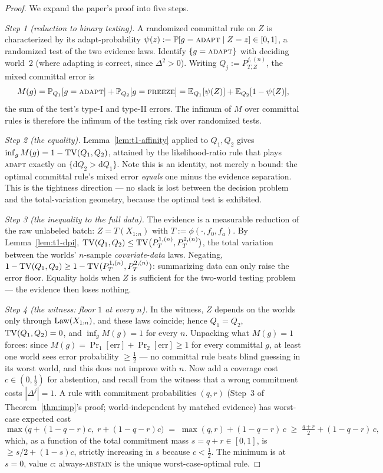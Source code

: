 \begin{proof}
We expand the paper's proof into five steps.

\emph{Step 1 (reduction to binary testing).}
A randomized committal rule on $Z$ is characterized by its adapt-probability
$\psi(z):=\Pr[g=\textsc{adapt}\mid Z=z]\in[0,1]$, a randomized test of the
two evidence laws. Identify $\{g=\textsc{adapt}\}$ with deciding world~2
(where adapting is correct, since $\Delta^2>0$). Writing
$Q_j:=P_{T,Z}^{j,(n)}$, the mixed committal error is
\[
M(g)=\Pr_{Q_1}[g=\textsc{adapt}]+\Pr_{Q_2}[g=\textsc{freeze}]
=\E_{Q_1}[\psi(Z)]+\E_{Q_2}[1-\psi(Z)],
\]
the sum of the test's type-I and type-II errors. The infimum of $M$ over
committal rules is therefore the infimum of the testing risk over
randomized tests.

\emph{Step 2 (the equality).}
Lemma~\ref{lem:t1-affinity} applied to $Q_1,Q_2$ gives
$\inf_g M(g)=1-\TV(Q_1,Q_2)$, attained by the likelihood-ratio rule that
plays \textsc{adapt} exactly on $\{\mathrm dQ_2>\mathrm dQ_1\}$. Note this
is an identity, not merely a bound: the optimal committal rule's mixed
error \emph{equals} one minus the evidence separation. This is the
tightness direction --- no slack is lost between the decision problem and
the total-variation geometry, because the optimal test is exhibited.

\emph{Step 3 (the inequality to the full data).}
The evidence is a measurable reduction of the raw unlabeled batch:
$Z=T(X_{1:n})$ with $T:=\phi(\cdot,f_0,f_a)$. By Lemma~\ref{lem:t1-dpi},
$\TV(Q_1,Q_2)\le\TV\bigl(P_T^{1,(n)},P_T^{2,(n)}\bigr)$, the total
variation between the worlds' $n$-sample \emph{covariate-data} laws.
Negating, $1-\TV(Q_1,Q_2)\ge1-\TV(P_T^{1,(n)},P_T^{2,(n)})$: summarizing
data can only raise the error floor. Equality holds when $Z$ is sufficient
for the two-world testing problem --- the evidence then loses nothing.

\emph{Step 4 (the witness: floor $1$ at every $n$).}
In the witness, $Z$ depends on the worlds only through $\Law(X_{1:n})$,
and these laws coincide; hence $Q_1=Q_2$, $\TV(Q_1,Q_2)=0$, and
$\inf_g M(g)=1$ for every $n$. Unpacking what $M(g)=1$ forces: since
$M(g)=\Pr_1[\text{err}]+\Pr_2[\text{err}]\ge1$ for every committal $g$,
at least one world sees error probability $\ge\tfrac12$ --- no committal
rule beats blind guessing in its worst world, and this does not improve
with $n$. Now add a coverage cost $c\in(0,\tfrac12)$ for abstention, and
recall from the witness that a wrong commitment costs $|\Delta^j|=1$.
A rule with commitment probabilities $(q,r)$ (Step~3 of
Theorem~\ref{thm:imp}'s proof; world-independent by matched evidence) has
worst-case expected cost
\[
\max\bigl(q+ (1-q-r)c,\; r+(1-q-r)c\bigr)
\;=\;\max(q,r)+(1-q-r)\,c
\;\ge\;\tfrac{q+r}{2}+(1-q-r)\,c,
\]
which, as a function of the total commitment mass $s=q+r\in[0,1]$, is
$\ge s/2+(1-s)c$, strictly increasing in $s$ because $c<\tfrac12$. The
minimum is at $s=0$, value $c$: always-\textsc{abstain} is the unique
worst-case-optimal rule.


\end{proof}
